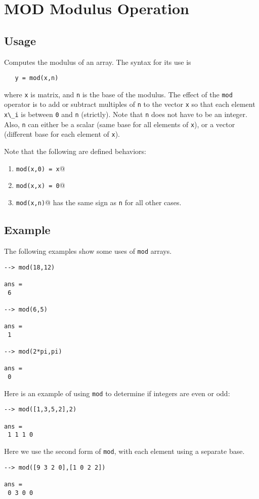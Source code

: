 \section{MOD Modulus Operation}

\subsection{Usage}

Computes the modulus of an array.  The syntax for its use is
\begin{verbatim}
   y = mod(x,n)
\end{verbatim}
where \verb|x| is matrix, and \verb|n| is the base of the modulus.  The
effect of the \verb|mod| operator is to add or subtract multiples of \verb|n|
to the vector \verb|x| so that each element \verb|x\_i| is between \verb|0| and \verb|n|
(strictly).  Note that \verb|n| does not have to be an integer.  Also,
\verb|n| can either be a scalar (same base for all elements of \verb|x|), or a
vector (different base for each element of \verb|x|).

Note that the following are defined behaviors:
\begin{enumerate}
\item \verb|mod(x,0) = x|@
\item \verb|mod(x,x) = 0|@
\item \verb|mod(x,n)|@ has the same sign as \verb|n| for all other cases.
\end{enumerate}
\subsection{Example}

The following examples show some uses of \verb|mod|
arrays.
\begin{verbatim}
--> mod(18,12)

ans = 
 6 

--> mod(6,5)

ans = 
 1 

--> mod(2*pi,pi)

ans = 
 0 
\end{verbatim}
Here is an example of using \verb|mod| to determine if integers are even
 or odd:
\begin{verbatim}
--> mod([1,3,5,2],2)

ans = 
 1 1 1 0 
\end{verbatim}
Here we use the second form of \verb|mod|, with each element using a 
separate base.
\begin{verbatim}
--> mod([9 3 2 0],[1 0 2 2])

ans = 
 0 3 0 0 
\end{verbatim}
